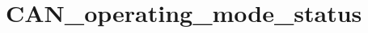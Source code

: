 \hypertarget{group___c_a_n__operating__mode__status}{\section{C\-A\-N\-\_\-operating\-\_\-mode\-\_\-status}
\label{group___c_a_n__operating__mode__status}
}
